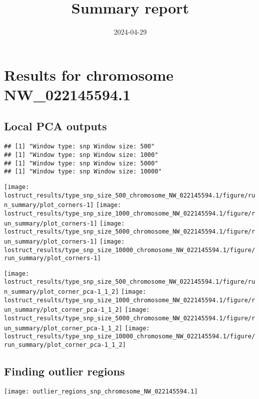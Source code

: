 \documentclass[
]{article}
\title{Summary report}
\author{}
\date{\vspace{-2.5em}2024-04-29}
\begin{document}
\maketitle

\section{Results for chromosome
NW\_022145594.1}\label{results-for-chromosome-nw_022145594.1}

\subsection{Local PCA outputs}\label{local-pca-outputs}

\begin{verbatim}
## [1] "Window type: snp Window size: 500"
## [1] "Window type: snp Window size: 1000"
## [1] "Window type: snp Window size: 5000"
## [1] "Window type: snp Window size: 10000"
\end{verbatim}

\texttt{[image: lostruct\_results/type\_snp\_size\_500\_chromosome\_NW\_022145594.1/figure/run\_summary/plot\_corners-1]}
\texttt{[image: lostruct\_results/type\_snp\_size\_1000\_chromosome\_NW\_022145594.1/figure/run\_summary/plot\_corners-1]}
\texttt{[image: lostruct\_results/type\_snp\_size\_5000\_chromosome\_NW\_022145594.1/figure/run\_summary/plot\_corners-1]}
\texttt{[image: lostruct\_results/type\_snp\_size\_10000\_chromosome\_NW\_022145594.1/figure/run\_summary/plot\_corners-1]}

\texttt{[image: lostruct\_results/type\_snp\_size\_500\_chromosome\_NW\_022145594.1/figure/run\_summary/plot\_corner\_pca-1\_1\_2]}
\texttt{[image: lostruct\_results/type\_snp\_size\_1000\_chromosome\_NW\_022145594.1/figure/run\_summary/plot\_corner\_pca-1\_1\_2]}
\texttt{[image: lostruct\_results/type\_snp\_size\_5000\_chromosome\_NW\_022145594.1/figure/run\_summary/plot\_corner\_pca-1\_1\_2]}
\texttt{[image: lostruct\_results/type\_snp\_size\_10000\_chromosome\_NW\_022145594.1/figure/run\_summary/plot\_corner\_pca-1\_1\_2]}

\subsection{Finding outlier regions}\label{finding-outlier-regions}

\texttt{[image: outlier\_regions\_snp\_chromosome\_NW\_022145594.1]}
\end{document}
